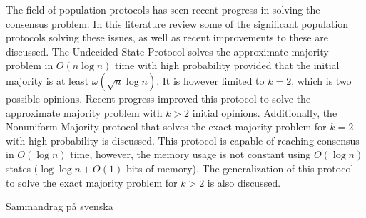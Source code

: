 \documentclass[english, 12pt, a4paper, sci, utf8, a-1b, online]{aaltothesis}
\date{\today}
\theoremstyle{definition}
\theoremstyle{remark}
\begin{document}
\makecoverpage


\makecopyrightpage




\begin{abstractpage}[english]
    The field of population protocols has seen recent progress in solving the consensus problem. In this literature review some of the significant population protocols solving these issues, as well as recent improvements to these are discussed. The Undecided State Protocol solves the approximate majority problem in $O(n \log n)$ time with high probability provided that the initial majority is at least $\omega(\sqrt{n} \log n)$. It is however limited to $k = 2$, which is two possible opinions. Recent progress improved this protocol to solve the approximate majority problem with $k > 2$ initial opinions. Additionally, the Nonuniform-Majority protocol that solves the exact majority problem for $k = 2$ with high probability is discussed. This protocol is capable of reaching consensus in $O(\log n)$ time, however, the memory usage is not constant using $O(\log n)$ states ($\log \log n + O(1)$ bits of memory). The generalization of this protocol to solve the exact majority problem for $k > 2$ is also discussed.
\end{abstractpage}

\newpage

\begin{abstractpage}[swedish]
    Sammandrag på svenska
\end{abstractpage}

\thesistableofcontents

\cleardoublepage














\clearpage

\thesisappendix
\end{document}
